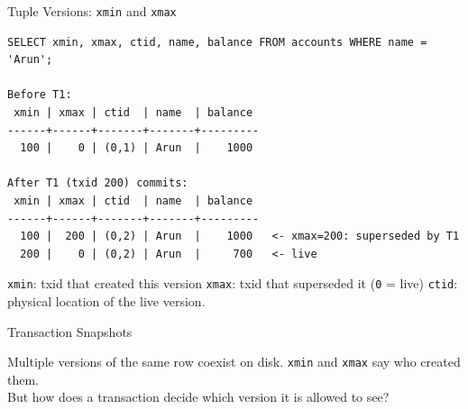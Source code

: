 \documentclass[aspectratio=169,10pt]{beamer}
\begin{document}
\begin{frame}[fragile]{Tuple Versions: \texttt{xmin} and \texttt{xmax}}

\begin{lstlisting}[style=ascii]
SELECT xmin, xmax, ctid, name, balance FROM accounts WHERE name = 'Arun';

Before T1:
 xmin | xmax | ctid  | name  | balance
------+------+-------+-------+---------
  100 |    0 | (0,1) | Arun  |    1000

After T1 (txid 200) commits:
 xmin | xmax | ctid  | name  | balance
------+------+-------+-------+---------
  100 |  200 | (0,2) | Arun  |    1000   <- xmax=200: superseded by T1
  200 |    0 | (0,2) | Arun  |     700   <- live
\end{lstlisting}

{\small \texttt{xmin}: txid that created this version \quad
\texttt{xmax}: txid that superseded it (\texttt{0} = live) \quad
\texttt{ctid}: physical location of the live version.}

\end{frame}

\begin{frame}{Transaction Snapshots}

  \begin{block}{}
    Multiple versions of the same row coexist on disk.
    \texttt{xmin} and \texttt{xmax} say who created them.\\[0.4em]
    But how does a transaction decide which version it is
    allowed to see?
  \end{block}

\end{frame}
\end{document}
